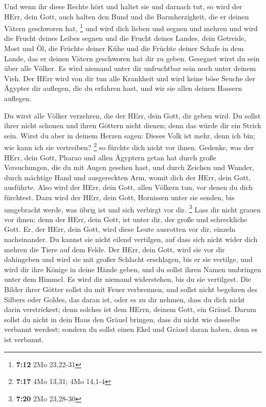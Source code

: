  Und wenn ihr diese Rechte hört und haltet sie und
darnach tut, so wird der HErr, dein Gott, auch halten den Bund und die
Barmherzigkeit, die er deinen Vätern geschworen hat, \footnote{\textbf{7:12}
  2Mo 23,22-31}  und wird dich lieben und segnen und
mehren und wird die Frucht deines Leibes segnen und die Frucht deines
Landes, dein Getreide, Most und Öl, die Früchte deiner Kühe und die
Früchte deiner Schafe in dem Lande, das er deinen Vätern geschworen hat
dir zu geben.  Gesegnet wirst du sein über alle Völker.
Es wird niemand unter dir unfruchtbar sein noch unter deinem Vieh.
 Der HErr wird von dir tun alle Krankheit und wird keine
böse Seuche der Ägypter dir auflegen, die du erfahren hast, und wir sie
allen deinen Hassern auflegen.

 Du wirst alle Völker verzehren, die der HErr, dein Gott,
dir geben wird. Du sollst ihrer nicht schonen und ihren Göttern nicht
dienen; denn das würde dir ein Strick sein.  Wirst du
aber in deinem Herzen sagen: Dieses Volk ist mehr, denn ich bin; wie
kann ich sie vertreiben? \footnote{\textbf{7:17} 4Mo 13,31; 4Mo 14,1-4}
 so fürchte dich nicht vor ihnen. Gedenke, was der HErr,
dein Gott, Pharao und allen Ägyptern getan hat  durch
große Versuchungen, die du mit Augen gesehen hast, und durch Zeichen und
Wunder, durch mächtige Hand und ausgereckten Arm, womit dich der HErr,
dein Gott, ausführte. Also wird der HErr, dein Gott, allen Völkern tun,
vor denen du dich fürchtest.  Dazu wird der HErr, dein
Gott, Hornissen unter sie senden, bis umgebracht werde, was übrig ist
und sich verbirgt vor dir. \footnote{\textbf{7:20} 2Mo 23,28-30}
 Lass dir nicht grauen vor ihnen; denn der HErr, dein
Gott, ist unter dir, der große und schreckliche Gott. 
Er, der HErr, dein Gott, wird diese Leute ausrotten vor dir, einzeln
nacheinander. Du kannst sie nicht eilend vertilgen, auf dass sich nicht
wider dich mehren die Tiere auf dem Felde.  Der HErr,
dein Gott, wird sie vor dir dahingeben und wird sie mit großer Schlacht
erschlagen, bis er sie vertilge,  und wird dir ihre
Könige in deine Hände geben, und du sollst ihren Namen umbringen unter
dem Himmel. Es wird dir niemand widerstehen, bis du sie vertilgest.
 Die Bilder ihrer Götter sollst du mit Feuer verbrennen,
und sollst nicht begehren des Silbers oder Goldes, das daran ist, oder
es zu dir nehmen, dass du dich nicht darin verstrickest; denn solches
ist dem HErrn, deinem Gott, ein Gräuel.  Darum sollst du
nicht in dein Haus den Gräuel bringen, dass du nicht wie dasselbe
verbannt werdest; sondern du sollst einen Ekel und Gräuel daran haben,
denn es ist verbannt.

